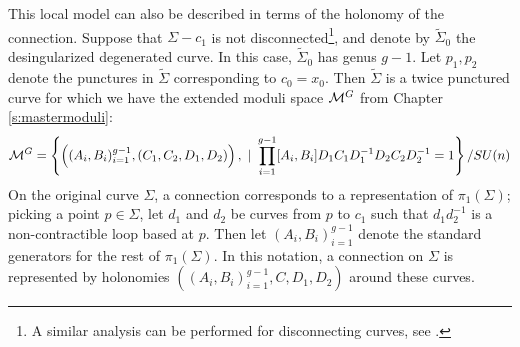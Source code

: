 	This local model can also be described in terms of the holonomy of the connection. Suppose that $\Sigma - c_1$ is not disconnected\footnote{A similar analysis can be performed for disconnecting curves, see \cite[Page 10]{biswas_degenerations_2021}.}, and denote by $\tilde{\Sigma}_0$ the desingularized degenerated curve. In this case, $\tilde{\Sigma}_0$ has genus $g-1$. Let $p_1, p_2$ denote the punctures in $\tilde{\Sigma}$ corresponding to $c_0 = x_0$. Then $\tilde{\Sigma}$ is a twice punctured curve for which we have the extended moduli space $\mathcal{M}^G$ from Chapter \ref{s:mastermoduli}:
	\begin{equation}
		\mathcal{M}^G = \left\{\left((A_i,B_i)_{i=1}^{g-1}, (C_1,C_2,D_1,D_2)\right), ~|~ \prod_{i=1}^{g-1}[A_i,B_i]D_1C_1D_1^{-1}D_2C_2D_2^{-1} = 1\right\} / SU(n)
	\end{equation}
	On the original curve $\Sigma$, a connection corresponds to a representation of $\pi_1(\Sigma)$; picking a point $p\in\Sigma$, let $d_1$ and $d_2$ be curves from $p$ to $c_1$ such that $d_1d^{-1}_2$ is a non-contractible loop based at $p$. Then let $(A_i,B_i)_{i=1}^{g-1}$ denote the standard generators for the rest of $\pi_1(\Sigma)$. In this notation, a connection on $\Sigma$ is represented by holonomies $\left((A_i,B_i)_{i=1}^{g-1}, C,D_1,D_2\right)$ around these curves.
	
